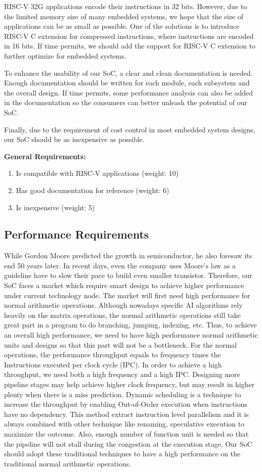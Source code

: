 RISC-V 32G applications encode their instructions in 32 bits. However, due to the limited memory size of many embedded systems, we hope that the size of applications can be as small as possible. One of the solutions is to introduce RISC-V C extension for compressed instructions, where instructions are encoded in 16 bits. If time permits, we should add the support for RISC-V C extension to further optimize for embedded systems.

To enhance the usability of our SoC, a clear and clean documentation is needed. Enough documentation should be written for each module, each subsystem and the overall design. If time permits, some performance analysis can also be added in the documentation so the consumers can better unleash the potential of our SoC.

Finally, due to the requirement of cost control in most embedded system designs, our SoC should be as inexpensive as possible.

\textbf{General Requirements:}
\begin{enumerate}
    \item Is compatible with RISC-V applications (weight: 10)
    \item Has good documentation for reference (weight: 6)
    \item Is inexpensive (weight: 5)
\end{enumerate}


\subsection{Performance Requirements}
While Gordon Moore predicted the growth in semiconductor, he also foresaw its end 50 years later. In recent days, even the company uses Moore's law as a guideline have to slow their pace to build even smaller transistor. Therefore, our SoC faces a market which require smart design to achieve higher performance under current technology node.
The market will first need high performance for normal arithmetic operations. Although nowadays specific AI algorithms rely heavily on the matrix operations, the normal arithmetic operations still take great part in a program to do branching, jumping, indexing, etc. Thus, to achieve an overall high performance, we need to have high performance normal arithmetic units and designs so that this part will not be a bottleneck. For the normal operations, the performance throughput equals to frequency times the Instructions executed per clock cycle (IPC). In order to achieve a high throughput, we need both a high frequency and a high IPC. Designing more pipeline stages may help achieve higher clock frequency, but may result in higher plenty when there is a miss prediction. Dynamic scheduling is a technique to increase the throughput by enabling Out-of-Order execution when instructions have no dependency. This method extract instruction level parallelism and it is always combined with other technique like renaming, speculative execution to  maximize the outcome. Also, enough number of function unit is needed so that the pipeline will not stall during the congestion at the execution stage. Our SoC should adopt these traditional techniques to have a high performance on the traditional normal arithmetic operations.

